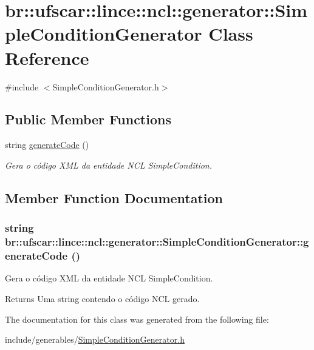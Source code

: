 \hypertarget{classbr_1_1ufscar_1_1lince_1_1ncl_1_1generator_1_1SimpleConditionGenerator}{
\section{br::ufscar::lince::ncl::generator::SimpleConditionGenerator Class Reference}
\label{classbr_1_1ufscar_1_1lince_1_1ncl_1_1generator_1_1SimpleConditionGenerator}
}


{\ttfamily \#include $<$SimpleConditionGenerator.h$>$}

\subsection*{Public Member Functions}
\begin{DoxyCompactItemize}
\item 
string \hyperlink{classbr_1_1ufscar_1_1lince_1_1ncl_1_1generator_1_1SimpleConditionGenerator_a18fb98374a9d8819650e01293f5741c1}{generateCode} ()
\begin{DoxyCompactList}\small\item\em Gera o código XML da entidade NCL SimpleCondition. \item\end{DoxyCompactList}\end{DoxyCompactItemize}


\subsection{Member Function Documentation}
\hypertarget{classbr_1_1ufscar_1_1lince_1_1ncl_1_1generator_1_1SimpleConditionGenerator_a18fb98374a9d8819650e01293f5741c1}{
\subsubsection[{generateCode}]{\setlength{\rightskip}{0pt plus 5cm}string br::ufscar::lince::ncl::generator::SimpleConditionGenerator::generateCode ()}}
\label{classbr_1_1ufscar_1_1lince_1_1ncl_1_1generator_1_1SimpleConditionGenerator_a18fb98374a9d8819650e01293f5741c1}


Gera o código XML da entidade NCL SimpleCondition. 

\begin{DoxyReturn}{Returns}
Uma string contendo o código NCL gerado. 
\end{DoxyReturn}


The documentation for this class was generated from the following file:\begin{DoxyCompactItemize}
\item 
include/generables/\hyperlink{SimpleConditionGenerator_8h}{SimpleConditionGenerator.h}\end{DoxyCompactItemize}
